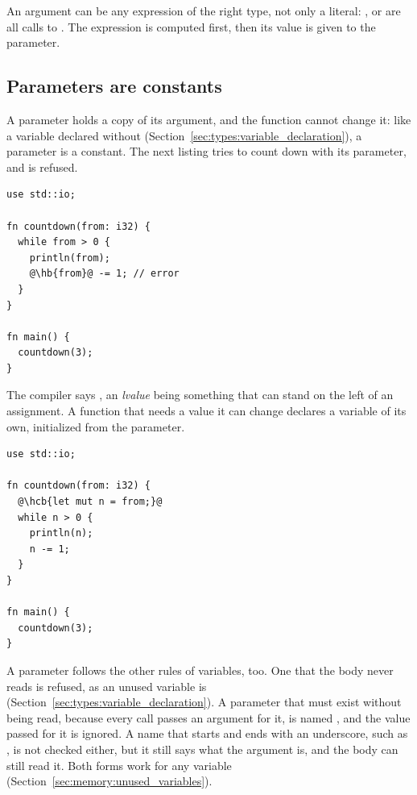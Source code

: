 An argument can be any expression of the right type, not only a literal:
,  or  are all
calls to . The expression is computed first, then its value is given
to the parameter.

\subsection{Parameters are constants}

A parameter holds a copy of its argument, and the function cannot change it:
like a variable declared without 
(Section~\ref{sec:types:variable_declaration}), a parameter is a constant. The
next listing tries to count down with its parameter, and is refused.

\begin{lstlisting}[style=coloredverbatimError, escapechar=@, caption=Assigning a parameter]
use std::io;

fn countdown(from: i32) {
  while from > 0 {
    println(from);
    @\hb{from}@ -= 1; // error
  }
}

fn main() {
  countdown(3);
}
\end{lstlisting}

The compiler says ,
an \textit{lvalue} being something that can stand on the left of an assignment.
A function that needs a value it can change declares a variable of its own,
initialized from the parameter.

\begin{lstlisting}[style=coloredverbatim, escapechar=@, caption=A mutable copy of a parameter]
use std::io;

fn countdown(from: i32) {
  @\hcb{let mut n = from;}@
  while n > 0 {
    println(n);
    n -= 1;
  }
}

fn main() {
  countdown(3);
}
\end{lstlisting}

A parameter follows the other rules of variables, too. One that the body never
reads is refused, as an unused variable is
(Section~\ref{sec:types:variable_declaration}). A parameter that must exist
without being read, because every call passes an argument for it, is named
\token{\_}, and the value passed for it is ignored. A name that starts and ends
with an underscore, such as , is not checked either, but it
still says what the argument is, and the body can still read it. Both forms
work for any variable (Section~\ref{sec:memory:unused_variables}).


